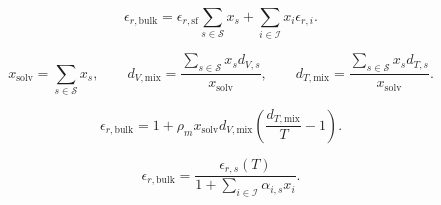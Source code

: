 \documentclass[11pt]{article}
\begin{document}
\begin{equation}
\epsilon_{r,\mathrm{bulk}}=
\epsilon_{r,\mathrm{sf}}\sum_{s\in\mathcal{S}}x_s
+\sum_{i\in\mathcal{I}}x_i\epsilon_{r,i}.
\label{eq:component_mixed_bulk_permittivity}
\end{equation}

\begin{equation}
x_{\mathrm{solv}}=\sum_{s\in\mathcal{S}}x_s,\qquad
d_{V,\mathrm{mix}}=\frac{\sum_{s\in\mathcal{S}}x_sd_{V,s}}{x_{\mathrm{solv}}},
\qquad
d_{T,\mathrm{mix}}=\frac{\sum_{s\in\mathcal{S}}x_sd_{T,s}}{x_{\mathrm{solv}}}.
\label{eq:density_correlation_mixed_parameters}
\end{equation}

\begin{equation}
\epsilon_{r,\mathrm{bulk}}=
1+\rho_m x_{\mathrm{solv}}d_{V,\mathrm{mix}}
\left(\frac{d_{T,\mathrm{mix}}}{T}-1\right).
\label{eq:density_correlated_bulk_permittivity}
\end{equation}

\begin{equation}
\epsilon_{r,\mathrm{bulk}}=
\frac{\epsilon_{r,s}(T)}
{1+\sum_{i\in\mathcal{I}}\alpha_{i,s}x_i}.
\label{eq:ion_specific_suppressed_bulk_permittivity}
\end{equation}
\end{document}
